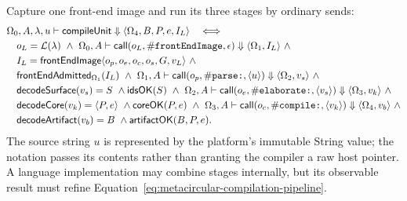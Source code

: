 Capture one front-end image and run its three stages by ordinary sends:
\begin{equation}\label{eq:metacircular-compilation-pipeline}
\begin{split}
 &\Omega_0,A,\lambda,u\vdash\mathsf{compileUnit}
      \Downarrow\langle\Omega_4,B,P,e,I_L\rangle
 \quad\Longleftrightarrow\\
 &\quad o_L=\mathcal L(\lambda)\ \land\
 \Omega_0,A\vdash\mathsf{call}(o_L,\selsym{frontEndImage},\epsilon)
      \Downarrow\langle\Omega_1,I_L\rangle\ \land\\
 &\quad I_L=\kw{frontEndImage}\langle o_p,o_e,o_c,o_s,G,v_L\rangle\ \land\\
 &\quad \mathsf{frontEndAdmitted}_{\Omega_1}(I_L)\ \land\
 \Omega_1,A\vdash\mathsf{call}(o_p,\selsym{parse:},\langle u\rangle)
      \Downarrow\langle\Omega_2,v_s\rangle\ \land\\
 &\quad \mathsf{decodeSurface}(v_s)=S\ \land\mathsf{idsOK}(S)\ \land\
 \Omega_2,A\vdash\mathsf{call}(o_e,\selsym{elaborate:},\langle v_s\rangle)
      \Downarrow\langle\Omega_3,v_k\rangle\ \land\\
 &\quad \mathsf{decodeCore}(v_k)=\langle P,e\rangle\ \land
       \mathsf{coreOK}(P,e)\ \land\
 \Omega_3,A\vdash\mathsf{call}(o_c,\selsym{compile:},\langle v_k\rangle)
      \Downarrow\langle\Omega_4,v_b\rangle\ \land\\
 &\quad \mathsf{decodeArtifact}(v_b)=B\ \land
       \mathsf{artifactOK}(B,P,e).
\end{split}
\end{equation}
The source string $u$ is represented by the platform's immutable String value;
the notation passes its contents rather than granting the compiler a raw host
pointer.  A language implementation may combine stages internally, but its
observable result must refine Equation~\eqref{eq:metacircular-compilation-pipeline}.


